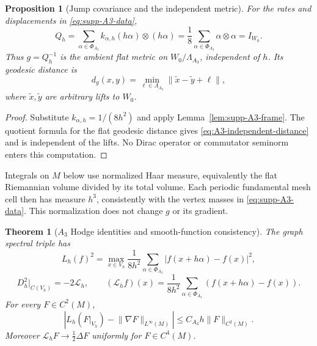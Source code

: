 \documentclass[11pt]{article}
\newtheorem{theorem}{Theorem}[section]
\newtheorem{proposition}[proposition]{Proposition}
\theoremstyle{definition}
\theoremstyle{remark}
\theoremstyle{definition}
\theoremstyle{remark}
\newcommand{\norm}[1]{\lVert#1\rVert}
\begin{document}
\begin{proposition}[Jump covariance and the independent metric]
\label{prop:A3-covariance}
For the rates and displacements in \eqref{eq:supp-A3-data},
\begin{equation}
 Q_h=\sum_{\alpha\in\Phi_{A_3}}k_{\alpha,h}
                  (h\alpha)\otimes(h\alpha)
     =\frac18\sum_{\alpha\in\Phi_{A_3}}\alpha\otimes\alpha
     =I_{W_0}.
 \label{eq:A3-jump-covariance}
\end{equation}
Thus $g=Q_h^{-1}$ is the ambient flat metric on $W_0/\Lambda_{A_3}$, independent
of $h$.  Its geodesic distance is
\begin{equation}
 d_g(x,y)=\min_{\ell\in\Lambda_{A_3}}
                  \|\widetilde x-\widetilde y+\ell\|,
 \label{eq:A3-independent-distance}
\end{equation}
where $\widetilde x,\widetilde y$ are arbitrary lifts to $W_0$.
\end{proposition}

\begin{proof}
Substitute $k_{\alpha,h}=1/(8h^2)$ and apply
Lemma~\ref{lem:supp-A3-frame}.  The quotient formula for the flat geodesic
distance gives \eqref{eq:A3-independent-distance} and is independent of the lifts.
No Dirac operator or commutator seminorm enters this computation.
\end{proof}

Integrals on $M$ below use normalized Haar measure, equivalently the flat
Riemannian volume divided by its total volume.  Each periodic fundamental mesh
cell then has measure $h^3$, consistently with the vertex masses in
\eqref{eq:supp-A3-data}.  This normalization does not change $g$ or its gradient.

\begin{theorem}[$A_3$ Hodge identities and smooth-function consistency]
\label{thm:supp-A3-finite}
The graph spectral triple has
\begin{equation}
 {
 L_h(f)^2
 =\max_{x\in V_h}\frac1{8h^2}
  \sum_{\alpha\in\Phi_{A_3}}
  |f(x+h\alpha)-f(x)|^2,}
 \label{eq:supp-A3-Lip}
\end{equation}
\begin{equation}
 {D_h^2|_{C(V_h)}=-2\mathcal L_h,}
 \qquad
 (\mathcal L_hf)(x)
 =\frac1{8h^2}\sum_{\alpha\in\Phi_{A_3}}
   (f(x+h\alpha)-f(x)).
 \label{eq:supp-A3-square}
\end{equation}
For every $F\in C^2(M)$,
\begin{equation}
 \left|L_h(F|_{V_h})-\norm{\nabla F}_{L^\infty(M)}\right|
 \le C_{A_3}h\norm F_{C^2(M)}.
 \label{eq:supp-A3-Lip-convergence}
\end{equation}
Moreover $\mathcal L_hF\to\frac12\Delta F$ uniformly for $F\in C^4(M)$.
\end{theorem}
\end{document}
